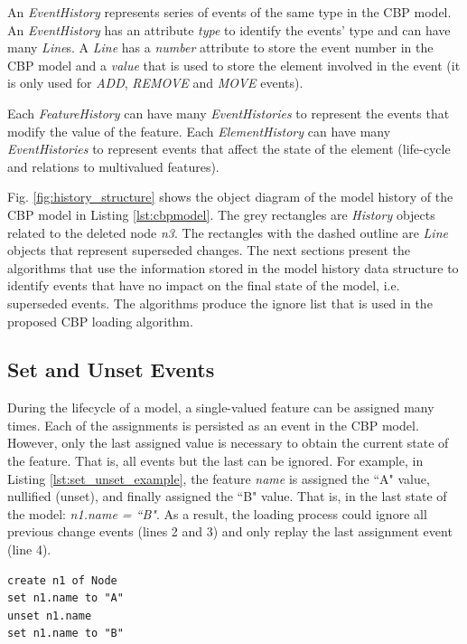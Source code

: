 \documentclass[12pt, a4paper]{report} \usepackage[titletoc]{appendix}
\begin{document}
An \emph{EventHistory} represents series of events of the same type in the CBP model. An \emph{EventHistory} has an attribute \emph{type} to identify the events' type and can have many \emph{Line}s. A \emph{Line} has a \emph{number} attribute to store the event number in the CBP model and a \emph{value} that is used to store the element involved in the event (it is only used for \emph{ADD}, \emph{REMOVE} and \emph{MOVE} events).

Each \emph{FeatureHistory} can have many \emph{EventHistories} to represent the events that modify the value of the feature. Each \emph{ElementHistory} can have many \emph{EventHistories} to represent events that affect the state of the element (life-cycle and relations to multivalued features).

Fig. \ref{fig:history_structure} shows the object diagram of the model history of the CBP model in Listing \ref{lst:cbpmodel}. The grey rectangles are \emph{History} objects related to the deleted node \emph{n3}. The rectangles with the dashed outline are \emph{Line} objects that represent superseded changes. The next sections present the algorithms that use the information stored in the model history data structure to identify events that have no impact on the final state of the model, i.e. superseded events. The algorithms produce the ignore list that is used in the proposed CBP loading algorithm.

\subsection{Set and Unset Events}
\label{subsec:set_and_unset_events}
During the lifecycle of a model, a single-valued feature can be assigned many times. Each of the assignments is persisted as an event in the CBP model. However, only the last assigned value is necessary to obtain the current state of the feature.  That is, all events but the last can be ignored. For example, in Listing \ref{lst:set_unset_example}, the feature \emph{name} is assigned the ``A" value, nullified (unset), and finally assigned the ``B" value. That is, in the last state of the model: \emph{n1.name = ``B"}. As a result, the loading process could ignore all previous change events (lines 2 and 3) and only replay the last assignment event (line 4). 

\begin{lstlisting}[style=eol,caption={The CBP representation of attribute \emph{name} assignments.},label=lst:set_unset_example]
create n1 of Node
set n1.name to "A"
unset n1.name
set n1.name to "B"
\end{lstlisting}
\end{document}
